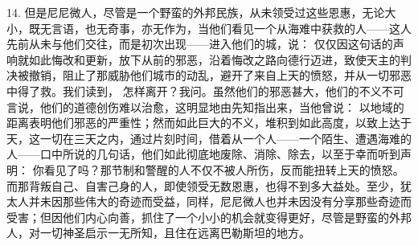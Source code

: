 14. 但是尼尼微人，尽管是一个野蛮的外邦民族，从未领受过这些恩惠，无论大小，既无言语，也无奇事，亦无作为，当他们看见一个从海难中获救的人——这人先前从未与他们交往，而是初次出现——进入他们的城，说： 仅仅因这句话的声响就如此悔改和更新，放下从前的邪恶，沿着悔改之路向德行迈进，致使天主的判决被撤销，阻止了那威胁他们城市的动乱，避开了来自上天的愤怒，并从一切邪恶中得了救。我们读到， 怎样离开？我问。虽然他们的邪恶甚大，他们的不义不可言说，他们的道德创伤难以治愈，这明显地由先知指出来，当他曾说： 以地域的距离表明他们邪恶的严重性；然而如此巨大的不义，堆积到如此高度，以致上达于天，这一切在三天之内，通过片刻时间，借着从一个人——一个陌生、遭遇海难的人——口中所说的几句话，他们如此彻底地废除、消除、除去，以至于幸而听到声明： 你看见了吗？那节制和警醒的人不仅不被人所伤，反而能扭转上天的愤怒。而那背叛自己、自害己身的人，即使领受无数恩惠，也得不到多大益处。至少，犹太人并未因那些伟大的奇迹而受益，同样，尼尼微人也并未因没有分享那些奇迹而受害；但因他们内心向善，抓住了一个小小的机会就变得更好，尽管是野蛮的外邦人，对一切神圣启示一无所知，且住在远离巴勒斯坦的地方。\par


